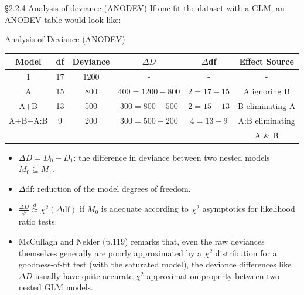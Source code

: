 \documentclass{beamer}
\newenvironment{wideitemize}%
  {\begin{itemize}%
    \setlength{\parskip}{1em}}%
  {\end{itemize}}
\begin{document}
\begin{frame}{\S2.2.4 Analysis of deviance (ANODEV)}
If one fit the dataset with a  GLM, an ANODEV table would look like:

\begin{center} Analysis of Deviance (ANODEV)\end{center}

{\footnotesize
\begin{tabular}{|cccccc|}\hline
Model & df & Deviance & $\Delta D$ & $\Delta$df & Effect Source \\ \hline
1 & 17 & 1200 & - & - & - \\ \hline
A & 15 & 800 & $400\!=\!1200\!-\!800$ & $2\!=\!17\!-\!15$ & A ignoring B \\ \hline
A+B & 13 & 500 & $300\!=\!800\!-\!500$ & $2\!=\!15\!-\!13$ & B eliminating A\\ \hline
A+B+A:B & 9 & 200 & $300\!=\!500\!-\!200$ & $4\!=\!13\!-\!9$ & A:B eliminating \\ 
& & & &  & A \& B \\ \hline 
\end{tabular}}

\end{frame}

\begin{frame}
\begin{wideitemize}
\item
$\Delta D=D_0-D_1$: the difference in deviance between two nested models $M_0\subseteq M_1$.

\item
$\Delta$df: reduction of the model degrees of freedom.

\item $\frac{\Delta D}{\phi}\stackrel{d}{\approx}\chi^2(\Delta\mbox{df})$ if $M_0$ is adequate according to $\chi^2$ asymptotics for likelihood ratio tests. 

\item McCullagh and Nelder (p.119) remarks that, even the raw deviances themselves generally are poorly approximated by a $\chi^2$ distribution for a goodness-of-fit test (with the saturated model), the deviance differences like $\Delta D$ usually have quite accurate $\chi^2$ approximation property between two nested GLM models. 




\end{wideitemize}
\end{frame}
\end{document}
